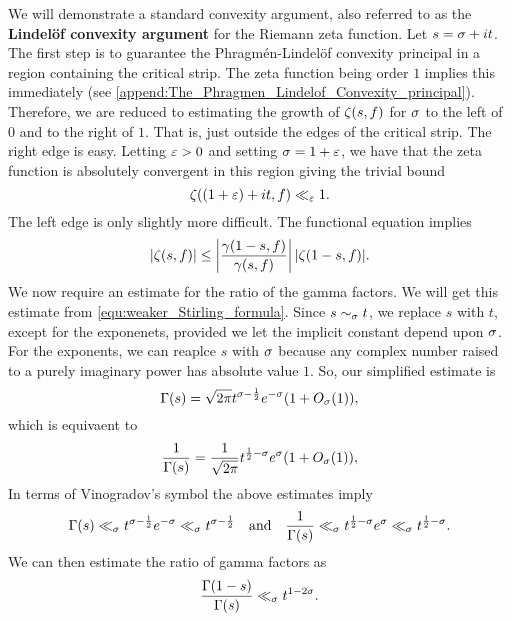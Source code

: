     We will demonstrate a standard convexity argument, also referred to as the \textbf{Lindel\"of convexity argument} for the Riemann zeta function. Let $s = \sigma+it$. The first step is to guarantee the Phragm\'en-Lindel\"of convexity principal in a region containing the critical strip. The zeta function being order $1$ implies this immediately (see \cref{append:The_Phragmen_Lindelof_Convexity_principal}). Therefore, we are reduced to estimating the growth of $\zeta(s,f)$ for $\sigma$ to the left of $0$ and to the right of $1$. That is, just outside the edges of the critical strip. The right edge is easy. Letting $\varepsilon > 0$ and setting $\sigma = 1+\varepsilon$, we have that the zeta function is absolutely convergent in this region giving the trivial bound
    \begin{equation}\label{equ:convexity_bound_1}
      \zeta((1+\varepsilon)+it,f) \ll_{\varepsilon} 1.
    \end{equation}
    The left edge is only slightly more difficult. The functional equation implies
    \begin{equation}\label{equ:convexity_bound_left_edge}
      |\zeta(s,f)| \le \left|\frac{\gamma(1-s,f)}{\gamma(s,f)}\right||\zeta(1-s,f)|.
    \end{equation}
    We now require an estimate for the ratio of the gamma factors. We will get this estimate from \cref{equ:weaker_Stirling_formula}. Since $s \sim_{\sigma} t$, we replace $s$ with $t$, except for the exponenets, provided we let the implicit constant depend upon $\sigma$. For the exponents, we can reaplce $s$ with $\sigma$ because any complex number raised to a purely imaginary power has absolute value $1$. So, our simplified estimate is
    \[
      \Gamma(s) = \sqrt{2\pi}t^{\sigma-\frac{1}{2}}e^{-\sigma}(1+O_{\sigma}(1)),
    \]
    which is equivaent to
    \[
      \frac{1}{\Gamma(s)} = \frac{1}{\sqrt{2\pi}}t^{\frac{1}{2}-\sigma}e^{\sigma}(1+O_{\sigma}(1)),
    \]
    In terms of Vinogradov's symbol the above estimates imply
    \[
      \Gamma(s) \ll_{\sigma} t^{\sigma-\frac{1}{2}}e^{-\sigma} \ll_{\sigma} t^{\sigma-\frac{1}{2}} \quad \text{and} \quad \frac{1}{\Gamma(s)} \ll_{\sigma} t^{\frac{1}{2}-\sigma}e^{\sigma} \ll_{\sigma} t^{\frac{1}{2}-\sigma}.
    \]
    We can then estimate the ratio of gamma factors as 
    \begin{equation}\label{equ:ratio_of_gamma_estimate}
      \frac{\Gamma(1-s)}{\Gamma(s)} \ll_{\sigma} t^{1-2\sigma}.
    \end{equation}

